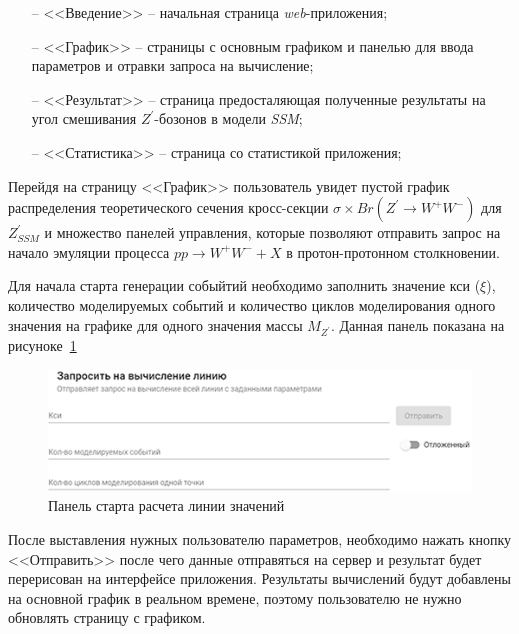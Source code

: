 \begin{enumerate}
	\item[--] <<Введение>> -- начальная страница \textit{web}-приложения;
	\item[--] <<График>> -- страницы с основным графиком и панелью для ввода параметров и отравки запроса на вычисление;
	\item[--] <<Результат>> -- страница предосталяющая полученные результаты на угол смешивания ${Z}^{\prime}$-бозонов в модели \textit{SSM};
	\item[--] <<Статистика>> -- страница со статистикой приложения;
\end{enumerate}

Перейдя на страницу <<График>> пользователь увидет пустой график распределения теоретического сечения кросс-секции $\sigma \times Br({Z}^{\prime} \rightarrow {W}^{+}{W}^{-})$ для ${Z}^{\prime}_{SSM}$ и множество панелей управления, которые позволяют отправить запрос на начало эмуляции процесса $pp \rightarrow {W}^{+}{W}^{-} + X$ в протон-протонном столкновении. 

Для начала старта генерации собыйтий необходимо заполнить значение кси ($\xi$), количество моделируемых событий и количество циклов моделирования одного значения на графике для одного значения массы ${M}_{{Z}^{\prime}}$. Данная панель показана на рисуноке~\ref{fig:request-line}


\vspace{16pt}
\begin{figure}[!h]
	\centering
	\includegraphics[width=\textwidth]{figures/request-line.png}
	\caption{Панель старта расчета линии значений}
	\label{fig:request-line}
\end{figure}

После выставления нужных пользователю параметров, необходимо нажать кнопку <<Отправить>> после чего данные отправяться на сервер и результат будет перерисован на интерфейсе приложения. Результаты вычислений будут добавлены на основной график в реальном времене, поэтому пользователю не нужно обновлять страницу с графиком.

